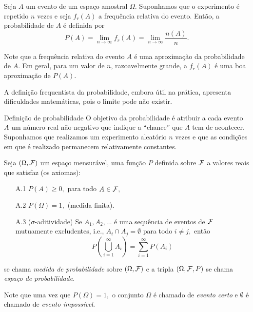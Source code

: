 \begin{frame}

 \begin{defi}
Seja $A$ um evento de um espaço amostral $\Omega$. Suponhamos que o experimento  é repetido $n$ vezes e seja $f_r(A)$ a frequência relativa do evento. Então, a probabilidade de $A$ é definida por 
$$
P(A) = \lim_{n \rightarrow \infty} f_r(A) = \lim_{n \rightarrow \infty} \frac{n(A)}{n}.
$$
\end{defi}

Note que a frequência relativa do evento $A$ é uma aproximação da probabilidade de $A$.  Em geral, para um valor de $n$, razoavelmente grande, a $f_r(A)$ é uma boa aproximação de $P(A).$

 \begin{nota}
A definição frequentista da probabilidade, embora útil na prática, apresenta dificuldades matemáticas, pois o limite pode não existir.
\end{nota}

\end{frame}

\begin{frame}{Definição de probabilidade}
O objetivo da probabilidade é atribuir a cada evento $A$ um número real
não-negativo que indique a ``chance'' que $A$ tem de acontecer. Suponhamos que
realizamos um experimento aleatório $n$ vezes e que as condições em que é
realizado permanecem relativamente constantes.

\begin{defi} 
Seja $(\Omega, {\cal F})$ um espaço mensurável, uma função $P$ definida sobre
${\cal F}$ a valores reais que satisfaz (os axiomas):
\begin{enumerate}
 \item[A.1]$P(A)\geq 0,$ para todo $ A\in {\cal F},$
\item[A.2] $P(\Omega)=1,$ (medida finita).
\item[A.3] ($\sigma$-aditividade) Se $A_1, A_2, \ldots$ é uma sequência de eventos de
${\cal F}$  mutuamente excludentes, i.e., $A_i\cap A_j=\emptyset$ para todo
$i\neq j,$ então 
\begin{equation}
\displaystyle
\label{ax3}
P\left(\bigcup_{i=1}^\infty A_i\right)=\sum_{i=1}^\infty P(A_i)
\end{equation}
\end{enumerate}
se chama {\it medida de probabilidade} sobre $(\Omega, {\cal F})$  e a
tripla $(\Omega, {\cal F}, P)$ se chama {\it espaço de probabilidade}.
\end{defi}

Note que  uma vez que $P(\Omega)=1,$ o conjunto $\Omega$ é chamado de {\it evento certo} e $\emptyset$ é chamado de {\it evento impossível}.
\end{frame}

